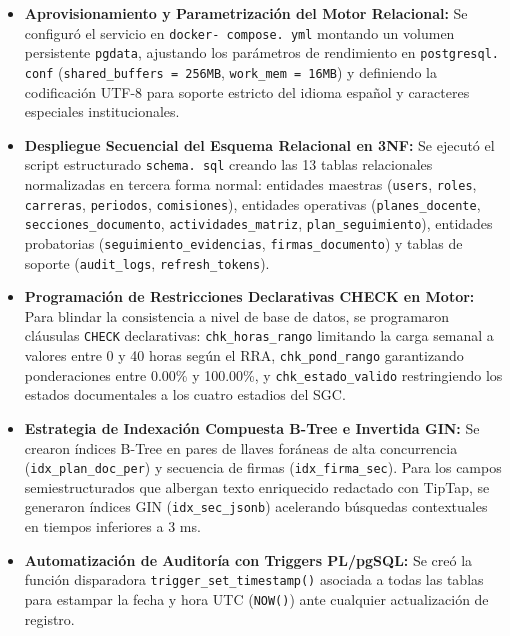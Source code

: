 \documentclass[12pt,a4paper]{article}
\begin{document}
\begin{itemize}[leftmargin=1.5em, itemsep=4pt]
    \item \textbf{Aprovisionamiento y Parametrización del Motor Relacional:} Se configuró el servicio en \texttt{docker- compose. yml} montando un volumen persistente \texttt{pgdata}, ajustando los parámetros de rendimiento en \texttt{postgresql. conf} (\texttt{shared\_\allowbreak  buffers = 256MB}, \texttt{work\_\allowbreak  mem = 16MB}) y definiendo la codificación UTF-8 para soporte estricto del idioma español y caracteres especiales institucionales.
    \item \textbf{Despliegue Secuencial del Esquema Relacional en 3NF:} Se ejecutó el script estructurado \texttt{schema. sql} creando las 13 tablas relacionales normalizadas en tercera forma normal: entidades maestras (\texttt{users}, \texttt{roles}, \texttt{carreras}, \texttt{periodos}, \texttt{comisiones}), entidades operativas (\texttt{planes\_\allowbreak  docente}, \texttt{secciones\_\allowbreak  documento}, \texttt{actividades\_\allowbreak  matriz}, \texttt{plan\_\allowbreak  seguimiento}), entidades probatorias (\texttt{seguimiento\_\allowbreak   evidencias}, \texttt{firmas\_\allowbreak   documento}) y tablas de soporte (\texttt{audit\_\allowbreak  logs}, \texttt{refresh\_\allowbreak  tokens}).
    \item \textbf{Programación de Restricciones Declarativas CHECK en Motor:} Para blindar la consistencia a nivel de base de datos, se programaron cláusulas \texttt{CHECK} declarativas: \texttt{chk\_\allowbreak  horas\_\allowbreak  rango} limitando la carga semanal a valores entre 0 y 40 horas según el RRA, \texttt{chk\_\allowbreak  pond\_\allowbreak  rango} garantizando ponderaciones entre 0.00\% y 100.00\%, y \texttt{chk\_\allowbreak  estado\_\allowbreak  valido} restringiendo los estados documentales a los cuatro estadios del SGC.
    \item \textbf{Estrategia de Indexación Compuesta B-Tree e Invertida GIN:} Se crearon índices B-Tree en pares de llaves foráneas de alta concurrencia (\texttt{idx\_\allowbreak  plan\_\allowbreak  doc\_\allowbreak  per}) y secuencia de firmas (\texttt{idx\_\allowbreak  firma\_\allowbreak  sec}). Para los campos semiestructurados que albergan texto enriquecido redactado con TipTap, se generaron índices GIN (\texttt{idx\_\allowbreak  sec\_\allowbreak  jsonb}) acelerando búsquedas contextuales en tiempos inferiores a 3 ms.
    \item \textbf{Automatización de Auditoría con Triggers PL/pgSQL:} Se creó la función disparadora \texttt{trigger\_\allowbreak  set\_\allowbreak  timestamp()} asociada a todas las tablas para estampar la fecha y hora UTC (\texttt{NOW()}) ante cualquier actualización de registro.
\end{itemize}
\end{document}
